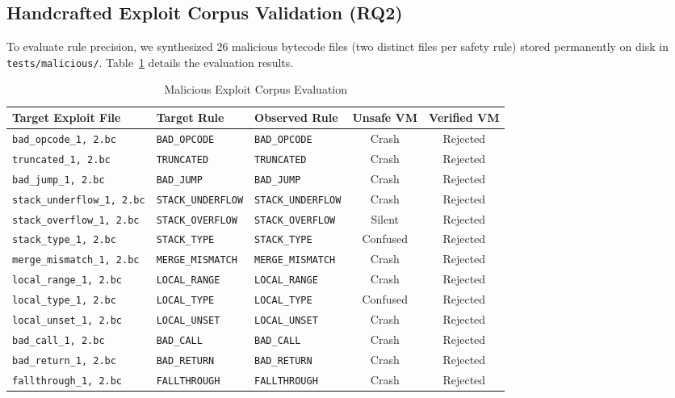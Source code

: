 \documentclass[conference]{IEEEtran}
\begin{document}
\subsection{Handcrafted Exploit Corpus Validation (RQ2)}
To evaluate rule precision, we synthesized 26 malicious bytecode files (two distinct files per safety rule) stored permanently on disk in \texttt{tests/malicious/}. Table~\ref{tab:malicious_results} details the evaluation results.

\begin{table}[htbp]
\caption{Malicious Exploit Corpus Evaluation}
\label{tab:malicious_results}
\centering
\begin{tabular}{lllcc}
\toprule
\textbf{Target Exploit File} & \textbf{Target Rule} & \textbf{Observed Rule} & \textbf{Unsafe VM} & \textbf{Verified VM} \\
\midrule
\texttt{bad\_opcode\_1, 2.bc} & \texttt{BAD\_OPCODE} & \texttt{BAD\_OPCODE} & Crash & Rejected \\
\texttt{truncated\_1, 2.bc} & \texttt{TRUNCATED} & \texttt{TRUNCATED} & Crash & Rejected \\
\texttt{bad\_jump\_1, 2.bc} & \texttt{BAD\_JUMP} & \texttt{BAD\_JUMP} & Crash & Rejected \\
\texttt{stack\_underflow\_1, 2.bc} & \texttt{STACK\_UNDERFLOW} & \texttt{STACK\_UNDERFLOW} & Crash & Rejected \\
\texttt{stack\_overflow\_1, 2.bc} & \texttt{STACK\_OVERFLOW} & \texttt{STACK\_OVERFLOW} & Silent & Rejected \\
\texttt{stack\_type\_1, 2.bc} & \texttt{STACK\_TYPE} & \texttt{STACK\_TYPE} & Confused & Rejected \\
\texttt{merge\_mismatch\_1, 2.bc} & \texttt{MERGE\_MISMATCH} & \texttt{MERGE\_MISMATCH} & Crash & Rejected \\
\texttt{local\_range\_1, 2.bc} & \texttt{LOCAL\_RANGE} & \texttt{LOCAL\_RANGE} & Crash & Rejected \\
\texttt{local\_type\_1, 2.bc} & \texttt{LOCAL\_TYPE} & \texttt{LOCAL\_TYPE} & Confused & Rejected \\
\texttt{local\_unset\_1, 2.bc} & \texttt{LOCAL\_UNSET} & \texttt{LOCAL\_UNSET} & Crash & Rejected \\
\texttt{bad\_call\_1, 2.bc} & \texttt{BAD\_CALL} & \texttt{BAD\_CALL} & Crash & Rejected \\
\texttt{bad\_return\_1, 2.bc} & \texttt{BAD\_RETURN} & \texttt{BAD\_RETURN} & Crash & Rejected \\
\texttt{fallthrough\_1, 2.bc} & \texttt{FALLTHROUGH} & \texttt{FALLTHROUGH} & Crash & Rejected \\
\bottomrule
\end{tabular}
\end{table}
\end{document}
